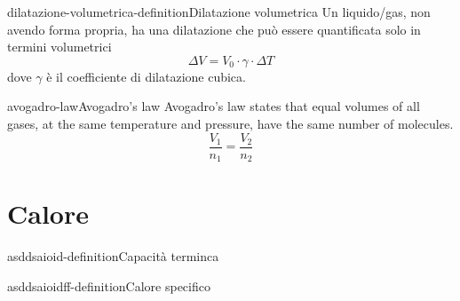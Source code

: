 \documentclass[preview]{standalone}
\begin{document}
\begin{snippetdefinition}{dilatazione-volumetrica-definition}{Dilatazione volumetrica}
    Un liquido/gas, non avendo forma propria, ha una dilatazione che può essere
    quantificata solo in termini volumetrici
    \[
        \Delta V = V_0 \cdot \gamma \cdot \Delta T
    \]
    dove \(\gamma\) è il coefficiente di dilatazione cubica.
\end{snippetdefinition}

\begin{snippettheorem}{avogadro-law}{Avogadro's law}
    Avogadro's law states that equal volumes of all gases, at the same temperature and pressure, have
    the same number of molecules.
    \[
        \frac{V_1}{n_1} = \frac{V_2}{n_2}
    \]
\end{snippettheorem}

\section{Calore}

\begin{snippetdefinition}{asddsaioid-definition}{Capacità terminca}
    \todo
\end{snippetdefinition}


\begin{snippetdefinition}{asddsaioidff-definition}{Calore specifico}
    \todo
\end{snippetdefinition}
\end{document}
